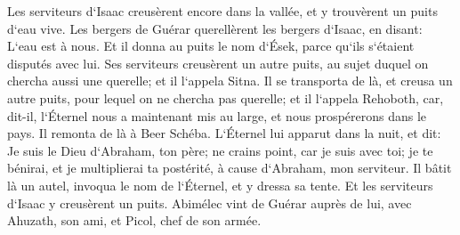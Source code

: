 \verse Les serviteurs d`Isaac creusèrent encore dans la vallée, et y trouvèrent un puits d`eau vive. 
\verse Les bergers de Guérar querellèrent les bergers d`Isaac, en disant: L`eau est à nous. Et il donna au puits le nom d`Ések, parce qu`ils s`étaient disputés avec lui. 
\verse Ses serviteurs creusèrent un autre puits, au sujet duquel on chercha aussi une querelle; et il l`appela Sitna. 
\verse Il se transporta de là, et creusa un autre puits, pour lequel on ne chercha pas querelle; et il l`appela Rehoboth, car, dit-il, l`Éternel nous a maintenant mis au large, et nous prospérerons dans le pays. 
\verse Il remonta de là à Beer Schéba. 
\verse L`Éternel lui apparut dans la nuit, et dit: Je suis le Dieu d`Abraham, ton père; ne crains point, car je suis avec toi; je te bénirai, et je multiplierai ta postérité, à cause d`Abraham, mon serviteur. 
\verse Il bâtit là un autel, invoqua le nom de l`Éternel, et y dressa sa tente. Et les serviteurs d`Isaac y creusèrent un puits. 
\verse Abimélec vint de Guérar auprès de lui, avec Ahuzath, son ami, et Picol, chef de son armée. 
